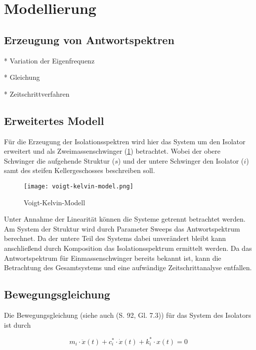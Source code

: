 \section{Modellierung}
\label{sec:modellierung}

\subsection{Erzeugung von Antwortspektren}

* Variation der Eigenfrequenz

* Gleichung

* Zeitschrittverfahren

\subsection{Erweitertes Modell}

Für die Erzeugung der Isolationsspektren wird hier das System um den Isolator erweitert und als Zweimassenschwinger (\cref{fig:vkm}) betrachtet.
Wobei der obere Schwinger die aufgehende Struktur ($s$) und der untere Schwinger den Isolator ($i$) samt des steifen Kellergeschosses beschreiben soll.

\begin{figure}[ht]
    \centering
    \texttt{[image: voigt-kelvin-model.png]}
    \caption{Voigt-Kelvin-Modell}
    \label{fig:vkm}
\end{figure}

Unter Annahme der Linearität können die Systeme getrennt betrachtet werden. Am System der Struktur wird durch Parameter Sweeps das Antwortspektrum berechnet. Da der untere Teil des Systems dabei unverändert bleibt kann anschließend durch Komposition das Isolationsspektrum ermittelt werden.
Da das Antwortspektrum für Einmassenschwinger bereits bekannt ist, kann die Betrachtung des Gesamtsystems und eine aufwändige Zeitschrittanalyse entfallen.

\subsection{Bewegungsgleichung}

Die Bewegungsgleichung (siehe auch \cite{Kramer} (S. 92, Gl. 7.3)) für das System des Isolators ist durch

\begin{equation}\label{eq:bewegungsgleichung}
m_i \cdot \ddot x(t) + c_i^* \cdot \dot x(t) + k_i^* \cdot x(t) = 0
\end{equation}

